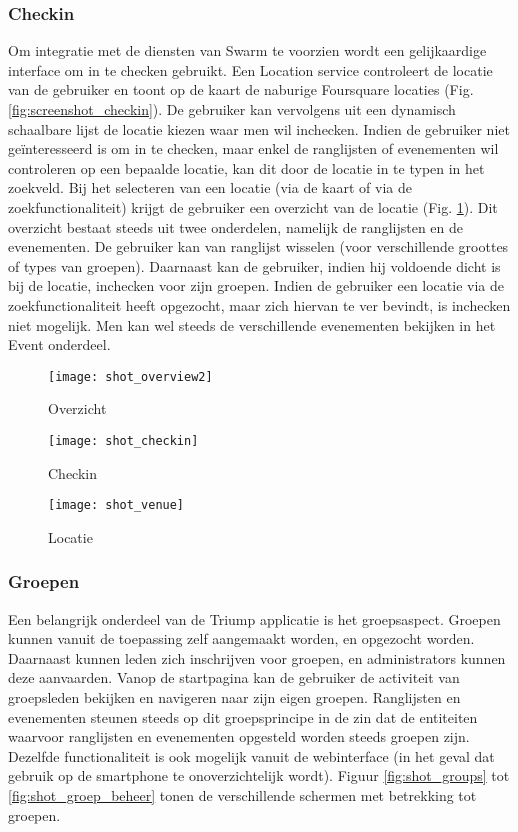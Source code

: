 \subsubsection{Checkin}%
Om integratie met de diensten van Swarm te voorzien wordt een gelijkaardige interface om in te checken gebruikt. Een Location service controleert de locatie van de gebruiker en toont op de kaart de naburige Foursquare locaties (Fig. \ref{fig:screenshot_checkin}). De gebruiker kan vervolgens uit een dynamisch schaalbare lijst de locatie kiezen waar men wil inchecken. Indien de gebruiker niet geïnteresseerd is om in te checken, maar enkel de ranglijsten of evenementen wil controleren op een bepaalde locatie, kan dit door de locatie in te typen in het zoekveld. Bij het selecteren van een locatie (via de kaart of via de zoekfunctionaliteit) krijgt de gebruiker een overzicht van de locatie (Fig. \ref{fig:screenshot_venue}). Dit overzicht bestaat steeds uit twee onderdelen, namelijk de ranglijsten en de evenementen. De gebruiker kan van ranglijst wisselen (voor verschillende groottes of types van groepen). Daarnaast kan de gebruiker, indien hij voldoende dicht is bij de locatie, inchecken voor zijn groepen. Indien de gebruiker een locatie via de zoekfunctionaliteit heeft opgezocht, maar zich hiervan te ver bevindt, is inchecken niet mogelijk. Men kan wel steeds  de verschillende evenementen bekijken in het Event onderdeel.
\begin{figure}[ht]
\begin{minipage}[b]{0.25\linewidth}
\centering
\texttt{[image: shot\_overview2]}
\caption{Overzicht}
\label{fig:screenshot_overview2}
\end{minipage}
\hspace{1.5cm}
\begin{minipage}[b]{0.25\linewidth}
\centering
\texttt{[image: shot\_checkin]}
\caption{Checkin}
\label{fig:screenshot_checkin}
\end{minipage}
\hspace{1.5cm}
\begin{minipage}[b]{0.25\linewidth}
\centering
\texttt{[image: shot\_venue]}
\caption{Locatie}
\label{fig:screenshot_venue}
\end{minipage}
\end{figure}
\clearpage
\subsubsection{Groepen}%
Een belangrijk onderdeel van de Triump applicatie is het groepsaspect. Groepen kunnen vanuit de toepassing zelf aangemaakt worden, en opgezocht worden. Daarnaast kunnen leden zich inschrijven voor groepen, en administrators kunnen deze aanvaarden. Vanop de startpagina kan de gebruiker de activiteit van groepsleden bekijken en navigeren naar zijn eigen groepen. Ranglijsten en evenementen steunen steeds op dit groepsprincipe in de zin dat de entiteiten waarvoor ranglijsten en evenementen opgesteld worden steeds groepen zijn. Dezelfde functionaliteit is ook mogelijk vanuit de webinterface (in het geval dat gebruik op de smartphone te onoverzichtelijk wordt).
Figuur \ref{fig:shot_groups} tot \ref{fig:shot_groep_beheer} tonen de verschillende schermen met betrekking tot groepen.

